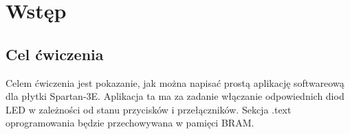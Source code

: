 \section{Wstęp}
\subsection{Cel ćwiczenia}
Celem ćwiczenia jest pokazanie, jak można napisać prostą aplikację softwareową dla płytki Spartan-3E.
Aplikacja ta ma za zadanie włączanie odpowiednich diod LED w zależności od stanu przycisków i przełączników. Sekcja .text oprogramowania będzie przechowywana w pamięci BRAM.

